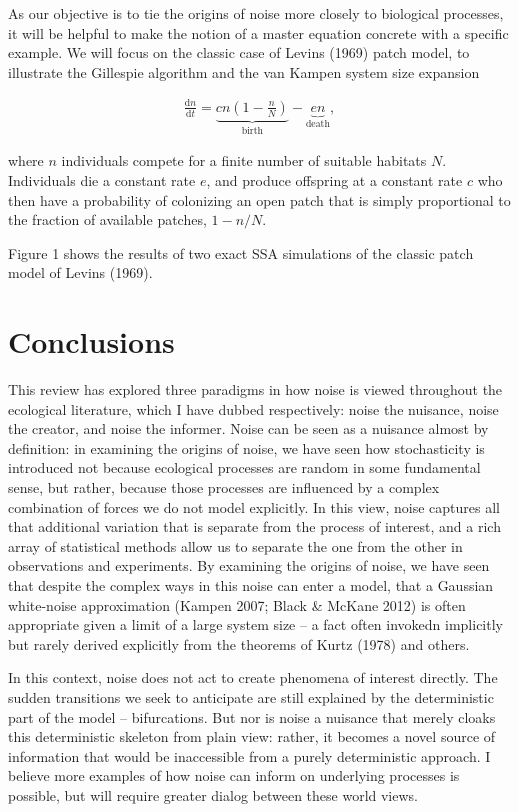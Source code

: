 \documentclass[
  authoryear,
  preprint]{elsarticle}
\begin{document}
As our objective is to tie the origins of noise more closely to
biological processes, it will be helpful to make the notion of a master
equation concrete with a specific example. We will focus on the classic
case of Levins (1969) patch model, to illustrate the Gillespie algorithm
and the van Kampen system size expansion

\begin{align}
\frac{\mathrm{d} n}{\mathrm{d} t} = \underbrace{c n \left(1 - \frac{n}{N}\right)}_{\textrm{birth}} - \underbrace{e n}_{\textrm{death}}, \label{levins}
\end{align}

where \(n\) individuals compete for a finite number of suitable habitats
\(N\). Individuals die a constant rate \(e\), and produce offspring at a
constant rate \(c\) who then have a probability of colonizing an open
patch that is simply proportional to the fraction of available patches,
\(1 - n/N\).

Figure 1 shows the results of two exact SSA simulations of the classic
patch model of Levins (1969).

\section{Conclusions}\label{conclusions}

This review has explored three paradigms in how noise is viewed
throughout the ecological literature, which I have dubbed respectively:
noise the nuisance, noise the creator, and noise the informer. Noise can
be seen as a nuisance almost by definition: in examining the origins of
noise, we have seen how stochasticity is introduced not because
ecological processes are random in some fundamental sense, but rather,
because those processes are influenced by a complex combination of
forces we do not model explicitly. In this view, noise captures all that
additional variation that is separate from the process of interest, and
a rich array of statistical methods allow us to separate the one from
the other in observations and experiments. By examining the origins of
noise, we have seen that despite the complex ways in this noise can
enter a model, that a Gaussian white-noise approximation (Kampen 2007;
Black \& McKane 2012) is often appropriate given a limit of a large
system size -- a fact often invokedn implicitly but rarely derived
explicitly from the theorems of Kurtz (1978) and others.

In this context, noise does not act to create phenomena of interest
directly. The sudden transitions we seek to anticipate are still
explained by the deterministic part of the model -- bifurcations. But
nor is noise a nuisance that merely cloaks this deterministic skeleton
from plain view: rather, it becomes a novel source of information that
would be inaccessible from a purely deterministic approach. I believe
more examples of how noise can inform on underlying processes is
possible, but will require greater dialog between these world views.
\end{document}
